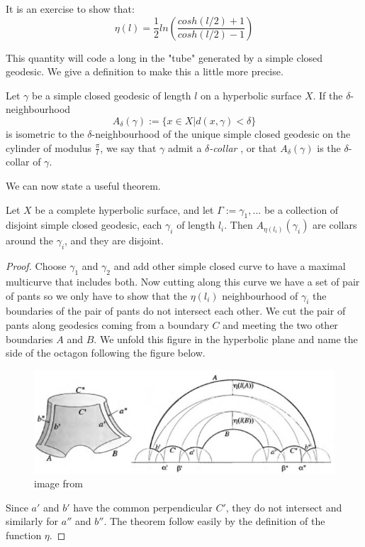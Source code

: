 



It is an exercise to show that:\[
\eta(l)= \frac{1}{2} ln(\frac{cosh(l/2)+1}{cosh(l/2)-1})
\]

This quantity will code a long in the "tube" generated by a simple closed geodesic. We give a definition to make this a little more precise. %

\begin{dfnt}
Let $\gamma$ be a simple closed geodesic of length $l$ on a hyperbolic surface $X$. If the $\delta$-neighbourhood \[
A_\delta(\gamma):= \{ x \in X | d(x,\gamma) < \delta \}
\]
is isometric to the $\delta$-neighbourhood of the unique simple closed geodesic on the cylinder of modulus $\frac{\pi}{l}$, we say that $\gamma$ admit a \emph{$\delta$-collar}
, or that $A_\delta(\gamma)$ is the $\delta$-collar of $\gamma$.
\end{dfnt}

We can now state a useful theorem.

\begin{thm}\label{ColLem}
Let $X$ be a complete hyperbolic surface, and let $\Gamma:={\gamma_1,...}$ be a collection of disjoint simple closed geodesic, each $\gamma_i$ of length $l_i$. Then $A_{\eta(l_i)}(\gamma_i)$ are collars around the $\gamma_i$, and they are disjoint.
\end{thm}

\begin{proof}
Choose $\gamma_1$ and $\gamma_2$ and add other simple closed curve to have a maximal multicurve that includes both.
Now cutting along this curve we have a set of pair of pants so we only have to show that the $\eta(l_i)$ neighbourhood of $\gamma_i$ the boundaries of the pair of pants do not intersect each other. We cut the pair of pants along geodesics coming from a boundary $C$ and meeting the two other boundaries $A$ and $B$. We unfold this figure in the hyperbolic plane and name the side of the octagon following the figure below.

\begin{figure}[h!]
\centering
\includegraphics[width=12cm]{Image/CollarProof.jpg}
\caption{image from \cite{hubbardhal01297628}}
\end{figure}

Since $a'$ and $b'$ have the common perpendicular $C'$, they do not intersect and similarly for $a''$ and $b''$. The theorem follow easily by the definition of the function $\eta$.

\end{proof}

